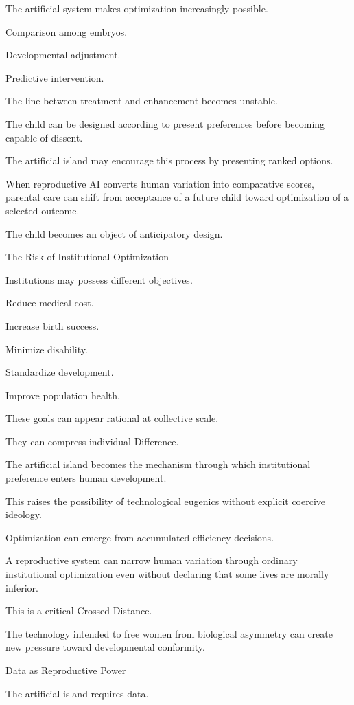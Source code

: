 The artificial system makes optimization increasingly possible.

Comparison among embryos.

Developmental adjustment.

Predictive intervention.

The line between treatment and enhancement becomes unstable.

The child can be designed according to present preferences before becoming capable of dissent.

The artificial island may encourage this process by presenting ranked options.

When reproductive AI converts human variation into comparative scores, parental care can shift from acceptance of a future child toward optimization of a selected outcome.

The child becomes an object of anticipatory design.

The Risk of Institutional Optimization

Institutions may possess different objectives.

Reduce medical cost.

Increase birth success.

Minimize disability.

Standardize development.

Improve population health.

These goals can appear rational at collective scale.

They can compress individual Difference.

The artificial island becomes the mechanism through which institutional preference enters human development.

This raises the possibility of technological eugenics without explicit coercive ideology.

Optimization can emerge from accumulated efficiency decisions.

A reproductive system can narrow human variation through ordinary institutional optimization even without declaring that some lives are morally inferior.

This is a critical Crossed Distance.

The technology intended to free women from biological asymmetry can create new pressure toward developmental conformity.

Data as Reproductive Power

The artificial island requires data.

